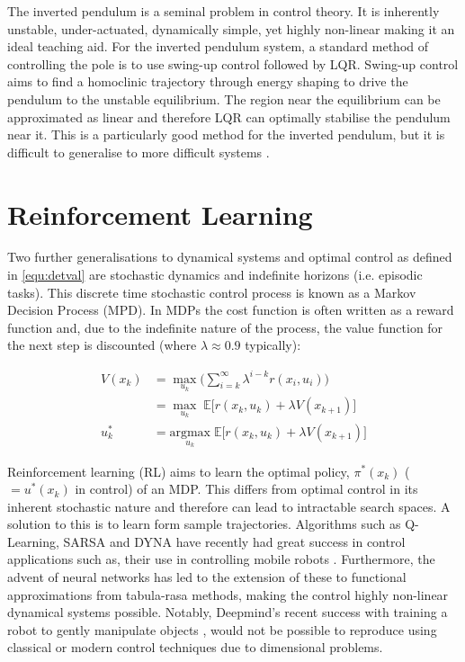\documentclass[../main.tex]{subfiles}
\begin{document}
The inverted pendulum is a seminal problem in control theory. It is inherently unstable, under-actuated, dynamically simple, yet highly non-linear making it an ideal teaching aid. For the inverted pendulum system, a standard method of controlling the pole is to use swing-up control followed by LQR. Swing-up control aims to find a homoclinic trajectory through energy shaping to drive the pendulum to the unstable equilibrium. The region near the equilibrium can be approximated as linear and therefore LQR can optimally stabilise the pendulum near it. This is a particularly good method for the inverted pendulum, but it is difficult to generalise to more difficult systems \cite{invpen}.

\section{Reinforcement Learning}
Two further generalisations to dynamical systems and optimal control as defined in \cref{equ:detval} are stochastic dynamics and indefinite horizons (i.e. episodic tasks). This discrete time stochastic control process is known as a Markov Decision Process (MPD). In MDPs the cost function is often written as a reward function and, due to the indefinite nature of the process, the value function for the next step is discounted (where $\lambda \approx 0.9$ typically):

\begin{align}
    \label{equ:mdpval} 
    V(x_k) & = \underset{u_k}{\max} \bigg( \sum_{i=k}^{\infty} \lambda^{i-k} r(x_i, u_i) \bigg) \\ 
    & = \underset{u_k}{\max} \; \mathbb{E} \Big[ r(x_k, u_k) + \lambda V(x_{k+1}) \Big] \\
    u^{*}_k & = \underset{u_k}{\text{argmax}}\; \mathbb{E} \Big[ r(x_k, u_k) + \lambda V(x_{k+1}) \Big]
\end{align}

Reinforcement learning (RL) aims to learn the optimal policy, $\pi^{*}(x_k)$ ($=u^{*}(x_k)$ in control) of an MDP. This differs from optimal control in its inherent stochastic nature and therefore can lead to intractable search spaces. A solution to this is to learn form sample trajectories. Algorithms such as Q-Learning, SARSA and DYNA have recently had great success in control applications such as, their use in controlling mobile robots \cite{Qlearning, RLoverview}. Furthermore, the advent of neural networks has led to the extension of these to functional approximations from tabula-rasa methods, making the control highly non-linear dynamical systems possible. Notably, Deepmind's recent success with training a robot to gently manipulate objects \cite{Robothand}, would not be possible to reproduce using classical or modern control techniques due to dimensional problems.
\end{document}
